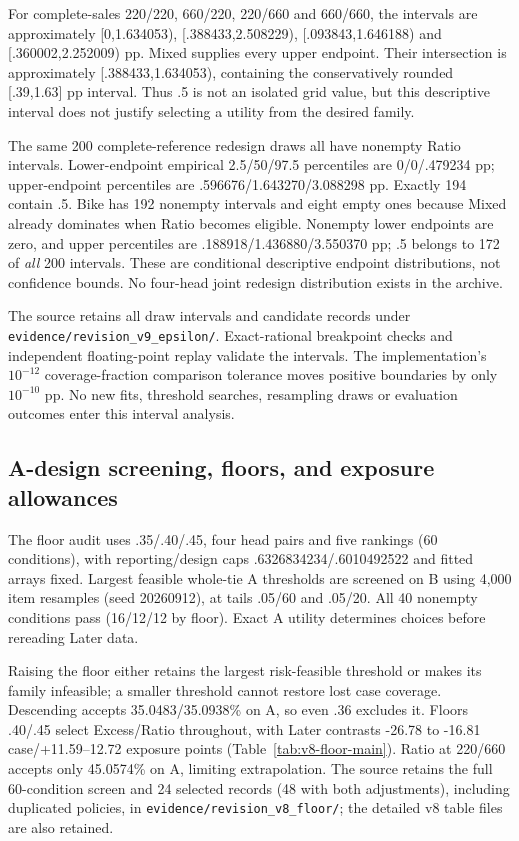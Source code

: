 For complete-sales 220/220, 660/220, 220/660 and 660/660, the intervals are approximately [0,1.634053), [.388433,2.508229), [.093843,1.646188) and [.360002,2.252009) pp. Mixed supplies every upper endpoint. Their intersection is approximately [.388433,1.634053), containing the conservatively rounded [.39,1.63] pp interval. Thus .5 is not an isolated grid value, but this descriptive interval does not justify selecting a utility from the desired family.

The same 200 complete-reference redesign draws all have nonempty Ratio intervals. Lower-endpoint empirical 2.5/50/97.5 percentiles are 0/0/.479234 pp; upper-endpoint percentiles are .596676/1.643270/3.088298 pp. Exactly 194 contain .5. Bike has 192 nonempty intervals and eight empty ones because Mixed already dominates when Ratio becomes eligible. Nonempty lower endpoints are zero, and upper percentiles are .188918/1.436880/3.550370 pp; .5 belongs to 172 of \emph{all} 200 intervals. These are conditional descriptive endpoint distributions, not confidence bounds. No four-head joint redesign distribution exists in the archive.

The source retains all draw intervals and candidate records under \texttt{evidence/revision\_v9\_epsilon/}. Exact-rational breakpoint checks and independent floating-point replay validate the intervals. The implementation's $10^{-12}$ coverage-fraction comparison tolerance moves positive boundaries by only $10^{-10}$ pp. No new fits, threshold searches, resampling draws or evaluation outcomes enter this interval analysis.

\FloatBarrier
\subsection{A-design screening, floors, and exposure allowances}
\label{app:v8-floor}
The floor audit uses .35/.40/.45, four head pairs and five rankings (60 conditions), with reporting/design caps .6326834234/.6010492522 and fitted arrays fixed. Largest feasible whole-tie A thresholds are screened on B using 4,000 item resamples (seed 20260912), at tails .05/60 and .05/20. All 40 nonempty conditions pass (16/12/12 by floor). Exact A utility determines choices before rereading Later data.

Raising the floor either retains the largest risk-feasible threshold or makes its family infeasible; a smaller threshold cannot restore lost case coverage. Descending accepts 35.0483/35.0938\% on A, so even .36 excludes it. Floors .40/.45 select Excess/Ratio throughout, with Later contrasts -26.78 to -16.81 case/+11.59--12.72 exposure points (Table~\ref{tab:v8-floor-main}). Ratio at 220/660 accepts only 45.0574\% on A, limiting extrapolation. The source retains the full 60-condition screen and 24 selected records (48 with both adjustments), including duplicated policies, in \texttt{evidence/revision\_v8\_floor/}; the detailed v8 table files are also retained.

